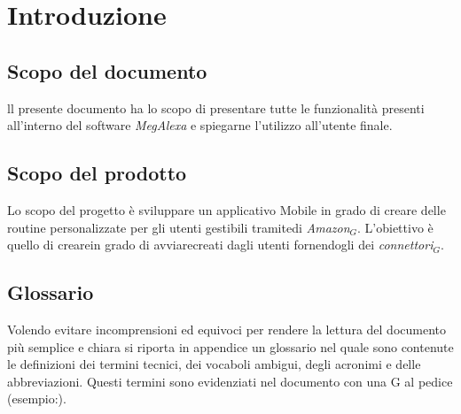 \chapter{Introduzione}
\label{Introduzione}

\section{Scopo del documento}
ll presente documento ha lo scopo di presentare tutte le funzionalità presenti all'interno del software \textit{MegAlexa} e spiegarne l'utilizzo all'utente finale.

\section{Scopo del prodotto}
Lo scopo del progetto è sviluppare un applicativo Mobile in grado di creare delle routine personalizzate per gli utenti gestibili tramitedi \textit{Amazon$_{G}$}. L’obiettivo è quello di crearein grado di avviarecreati dagli utenti fornendogli dei \textit{connettori$_{G}$}.


\section{Glossario}
Volendo evitare incomprensioni ed equivoci per rendere la lettura del documento più semplice
e chiara si riporta in appendice un glossario nel quale sono contenute le definizioni dei
termini tecnici, dei vocaboli ambigui, degli acronimi e delle abbreviazioni. Questi termini
sono evidenziati nel documento con una G al pedice (esempio:).
